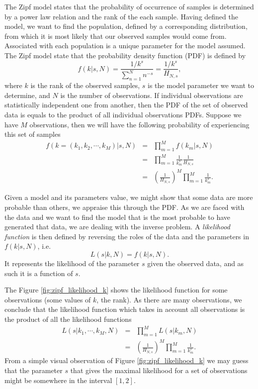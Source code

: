 The Zipf model states that the probability of occurrence of samples is determined by a power law relation
and the rank of the each sample. Having defined the model, we want to find the population, defined
by a corresponding distribution, from which it is most likely that our observed samples would come from.
Associated with each population is a unique parameter for the model assumed. The Zipf model state that the 
probability density function (PDF) is defined by
\begin{equation}
\label{eq:zipf_relation}
f(k | s, N) = \frac{1/k^s}{\sum_{n=1}^{N} n^{-s}} = \frac{1/k^s}{H_{N,s}} ,
\end{equation} 
where $k$ is the rank of the observed samples, $s$ is the model parameter we want to determine,
and $N$ is the number of observations.
If individual observations are statistically independent one from another, then the PDF
of the set of observed data is equals to the product of all individual observations PDFs.
Suppose we have $M$ observations, then we will have the following probability
of experiencing this set of samples
\begin{eqnarray}
f(k=(k_1, k_2, \cdots, k_M) | s, N) &=& \prod_{m=1}^{M} f(k_m | s, N) \nonumber \\
		&=& \prod_{m=1}^{M} \frac{1}{k_m^s} \frac{1}{H_{N,s}} \nonumber \\
		&=& \left( \frac{1}{H_{N,s}} \right)^M \prod_{m=1}^{M} \frac{1}{k_m^s} .
\end{eqnarray}

Given a model and its parameters value, we might show that some data are more probable than others,
we appraise this through the PDF. As we are faced with the data and we want to find the model
that is the most probable to have generated that data, we are dealing with the inverse problem.
A \textit{likelihood function} is then defined by reversing the roles of the data and the parameters
in $f(k | s, N)$, i.e.
\begin{equation}
L(s | k, N) = f(k | s, N) .
\end{equation}
It represents the likelihood of the parameter $s$ given the observed data, and as such it is a function of $s$.

The Figure \ref{fig:zipf_likelihood_k} shows the likelihood function for some observations (some values of $k$, the rank).
As there are many observations, we conclude that the likelihood function which takes in account all
observations is the product of all the likelihood functions
\begin{eqnarray}
L(s|k_1,\cdots,k_M,N) &=& \prod_{m=1}^{M} L(s|k_m,N) \nonumber \\
          &=& \left( \frac{1}{H_{N,s}} \right)^M \prod_{m=1}^{M} \frac{1}{k_m^s} .
\end{eqnarray}
From a simple visual observation of Figure \ref{fig:zipf_likelihood_k} we may guess that the parameter $s$ that
gives the maximal likelihood for a set of observations might be somewhere in the interval $[1,2]$.

